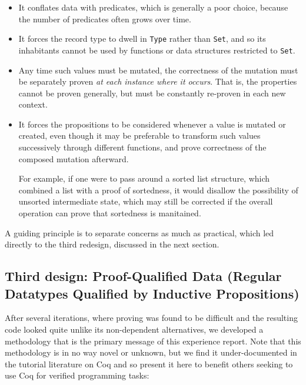 \documentclass{llncs}
\begin{document}
\begin{itemize}
\item It conflates data with predicates, which is generally a poor choice,
  because the number of predicates often grows over time.

\item It forces the record type to dwell in \texttt{Type} rather than
  \texttt{Set}, and so its inhabitants cannot be used by functions or data
  structures restricted to \texttt{Set}.

\item Any time such values must be mutated, the correctness of the mutation
  must be separately proven \emph{at each instance where it occurs}.  That is,
  the properties cannot be proven generally, but must be constantly re-proven
  in each new context.

\item It forces the propositions to be considered whenever a value is mutated
  or created, even though it may be preferable to transform such values
  successively through different functions, and prove correctness of the
  composed mutation afterward.

  For example, if one were to pass around a sorted list structure, which
  combined a list with a proof of sortedness, it would disallow the
  possibility of unsorted intermediate state, which may still be corrected if
  the overall operation can prove that sortedness is manitained.
\end{itemize}

A guiding principle is to separate concerns as much as practical, which led
directly to the third redesign, discussed in the next section.  

\subsection{Third design: Proof-Qualified Data (Regular Datatypes Qualified by Inductive
  Propositions)}
\label{sec:splitdesign}

After several iterations, where proving was found to be difficult and
the resulting code looked quite unlike its non-dependent alternatives,
we developed a methodology that is the primary message of this
experience report.  Note that this methodology is in no way novel or
unknown, but we find it under-documented in the tutorial literature on
Coq and so present it here to benefit others seeking to use Coq for
verified programming tasks:
\end{document}
